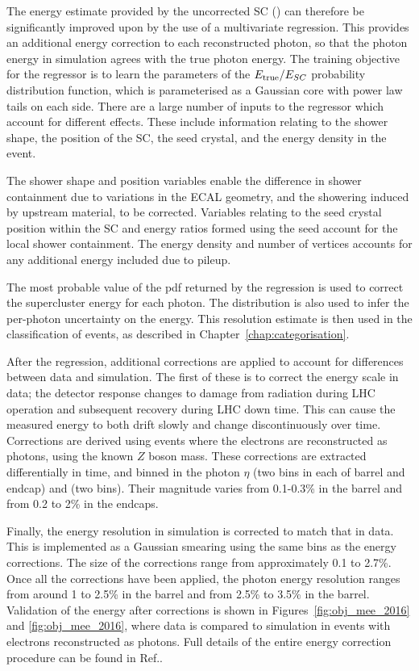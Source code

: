 The energy estimate provided by the uncorrected SC (\Eraw) can therefore be significantly improved upon by the use of a multivariate regression.
This provides an additional energy correction to each reconstructed photon, so that the photon energy in simulation agrees with the true photon energy.
The training objective for the regressor is to learn the parameters of the $E_{\mathrm{true}}/E_{SC}$ probability distribution function, 
which is parameterised as a Gaussian core with power law tails on each side. %
There are a large number of inputs to the regressor which account for different effects.
These include information relating to the shower shape, the position of the SC, the seed crystal, and the energy density in the event.

The shower shape and position variables enable the difference in shower containment due to variations in the ECAL geometry, 
and the showering induced by upstream material, to be corrected.
Variables relating to the seed crystal position within the SC and energy ratios formed using the seed account for the local shower containment.
The energy density and number of vertices accounts for any additional energy included due to pileup.

The most probable value of the pdf returned by the regression is used to correct the supercluster energy for each photon.
The distribution is also used to infer the per-photon uncertainty on the energy.
This resolution estimate is then used in the classification of events, as described in Chapter~\ref{chap:categorisation}.

After the regression, additional corrections are applied to account for differences between data and simulation.
The first of these is to correct the energy scale in data;
the detector response changes to damage from radiation during LHC operation and subsequent recovery during LHC down time.
This can cause the measured energy to both drift slowly and change discontinuously over time.
Corrections are derived using \Zee events where the electrons are reconstructed as photons, using the known $Z$ boson mass.
These corrections are extracted differentially in time, and binned in the photon $\eta$ (two bins in each of barrel and endcap) and \RNINE (two bins).
Their magnitude varies from 0.1-0.3\% in the barrel and from 0.2 to 2\% in the endcaps.

Finally, the energy resolution in simulation is corrected to match that in data.
This is implemented as a Gaussian smearing using the same bins as the energy corrections.
The size of the corrections range from approximately 0.1 to 2.7\%.
Once all the corrections have been applied, the photon energy resolution ranges from around 1 to 2.5\% in the barrel
and from 2.5\% to 3.5\% in the barrel.
Validation of the energy after corrections is shown in Figures~\ref{fig:obj_mee_2016} and \ref{fig:obj_mee_2016}, 
where data is compared to simulation in \Zee events with electrons reconstructed as photons.
Full details of the entire energy correction procedure can be found in Ref.\cite{PhotonReco}.

